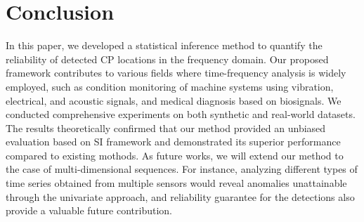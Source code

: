 \section{Conclusion}
\label{sec:conclusion}

In this paper, we developed a statistical inference method to quantify the reliability of detected CP locations in the frequency domain. 
%
Our proposed framework contributes to various fields where time-frequency analysis is widely employed, such as condition monitoring of machine systems using vibration, electrical, and acoustic signals, and medical diagnosis based on biosignals.
%
We conducted comprehensive experiments on both synthetic and real-world datasets. 
%
The results theoretically confirmed that our method provided an unbiased evaluation based on SI framework and demonstrated its superior performance compared to existing mothods.
%
As future works, we will extend our method to the case of multi-dimensional sequences. 
%
For instance, analyzing different types of time series obtained from multiple sensors would reveal anomalies unattainable through the univariate approach, and reliability guarantee for the detections also provide a valuable future contribution. 
